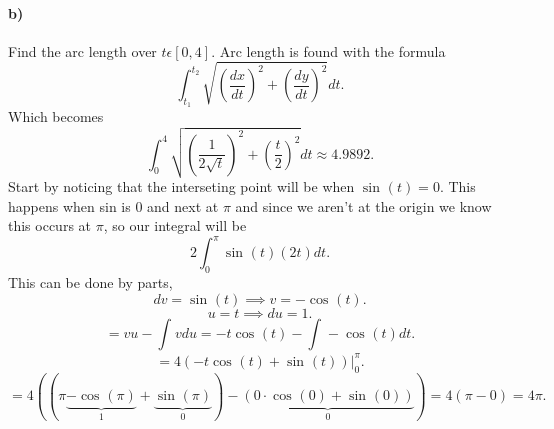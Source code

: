 \documentclass{report}
\begin{document}
\paragraph{b)} Find the arc length over $ t\epsilon\left[ 0,4 \right]  $.
Arc length is found with the formula 
\[
\int_{ t_1 }^{ t_2 } \sqrt{ \left( \frac{ dx }{ dt }  \right) ^2+ \left( \frac{ dy }{ dt }  \right) ^2 } dt
.\] 
Which becomes
\[
\int_{ 0 }^{ 4 } \sqrt{ \left( \frac{ 1 }{ 2\sqrt{ t }  }  \right) ^2+ \left( \frac{ t }{ 2 }  \right) ^2 } dt \approx 4.9892
.\] 
Start by noticing that the interseting point will be when $ \sin^{  } \left( t \right) =0 $. This happens when sin is 0 and next at $ \pi  $ and since we aren't at the origin we know this occurs at $ \pi  $, so our integral will be 
\[
2 \int_{ 0 }^{ \pi  } \sin^{  } \left( t \right) \left( 2t \right) dt
.\] 
This can be done by parts,
\[
dv=\sin^{  } \left( t \right) \implies v = -\cos^{  } \left( t \right) 
.\] 
\[
u=t \implies du = 1
.\] 
\[
=vu-\int_{  }^{  } vdu = -t\cos^{  } \left( t \right) -\int_{  }^{  } -\cos^{  } \left( t \right) dt
.\] 
\[
=4\left( -t\cos^{  } \left( t \right) +\sin^{  } \left( t \right)  \right) \bigg|_{ 0 }^{ \pi  }	
.\] 
\[
=4\left( \left( \pi \underbrace{ -\cos^{  } \left( \pi  \right)  }_{ 1 } +\underbrace{ \sin^{  } \left( \pi \right)  }_{ 0 }  \right) - \underbrace{ \left( 0\cdot \cos^{  } \left( 0 \right) +\sin^{  } \left( 0 \right)  \right)  }_{ 0 } \right) = 4\left( \pi -0 \right) =4\pi 
.\] 
\end{document}
